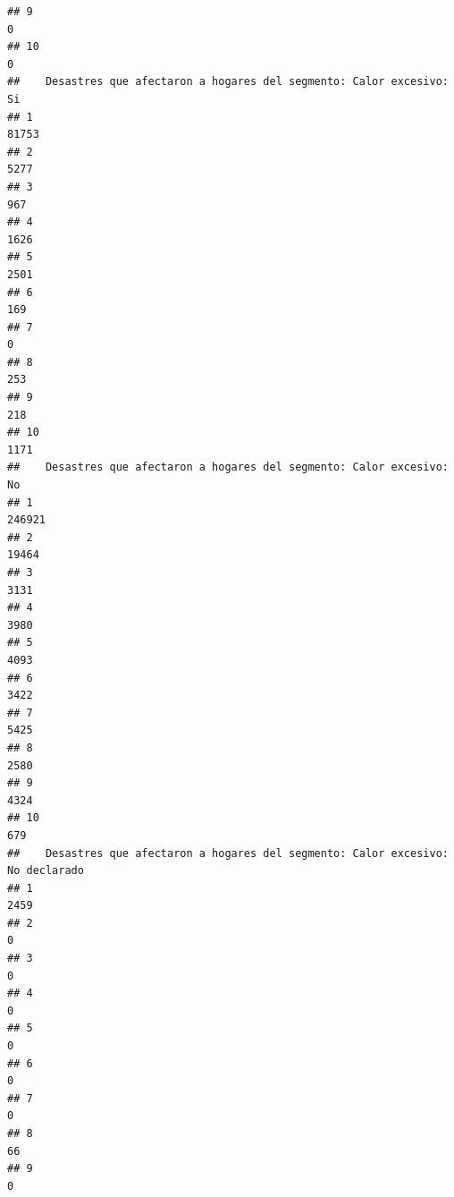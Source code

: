 \documentclass[11pt,]{article}
\begin{document}
\begin{verbatim}
## 9                                                                            0
## 10                                                                           0
##    Desastres que afectaron a hogares del segmento: Calor excesivo: Si
## 1                                                               81753
## 2                                                                5277
## 3                                                                 967
## 4                                                                1626
## 5                                                                2501
## 6                                                                 169
## 7                                                                   0
## 8                                                                 253
## 9                                                                 218
## 10                                                               1171
##    Desastres que afectaron a hogares del segmento: Calor excesivo: No
## 1                                                              246921
## 2                                                               19464
## 3                                                                3131
## 4                                                                3980
## 5                                                                4093
## 6                                                                3422
## 7                                                                5425
## 8                                                                2580
## 9                                                                4324
## 10                                                                679
##    Desastres que afectaron a hogares del segmento: Calor excesivo: No declarado
## 1                                                                          2459
## 2                                                                             0
## 3                                                                             0
## 4                                                                             0
## 5                                                                             0
## 6                                                                             0
## 7                                                                             0
## 8                                                                            66
## 9                                                                             0

\end{verbatim}
\end{document}
